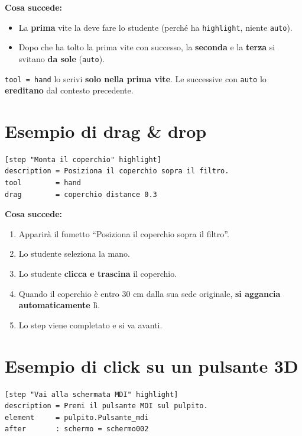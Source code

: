﻿\documentclass[a4paper,12pt,oneside]{book}
\newcommand{\val}[1]{\texttt{\color{cvtgreen}#1}}
\begin{document}
\textbf{Cosa succede:}

\begin{itemize}
  \item La \textbf{prima} vite la deve fare lo studente (perché ha
        \val{highlight}, niente \val{auto}).
  \item Dopo che ha tolto la prima vite con successo, la \textbf{seconda} e la
        \textbf{terza} si svitano \textbf{da sole} (\val{auto}).
\end{itemize}

\begin{trucchetto}
\val{tool = hand} lo scrivi \textbf{solo nella prima vite}. Le successive con
\val{auto} lo \textbf{ereditano} dal contesto precedente.
\end{trucchetto}

\section{Esempio di drag \& drop}

\begin{esempiocvt}
\begin{lstlisting}
[step "Monta il coperchio" highlight]
description = Posiziona il coperchio sopra il filtro.
tool        = hand
drag        = coperchio distance 0.3
\end{lstlisting}
\end{esempiocvt}

\textbf{Cosa succede:}

\begin{enumerate}
  \item Apparirà il fumetto ``Posiziona il coperchio sopra il filtro''.
  \item Lo studente seleziona la mano.
  \item Lo studente \textbf{clicca e trascina} il coperchio.
  \item Quando il coperchio è entro 30 cm dalla sua sede originale,
        \textbf{si aggancia automaticamente} lì.
  \item Lo step viene completato e si va avanti.
\end{enumerate}

\section{Esempio di click su un pulsante 3D}

\begin{esempiocvt}
\begin{lstlisting}
[step "Vai alla schermata MDI" highlight]
description = Premi il pulsante MDI sul pulpito.
element     = pulpito.Pulsante_mdi
after       : schermo = schermo002
\end{lstlisting}
\end{esempiocvt}
\end{document}
